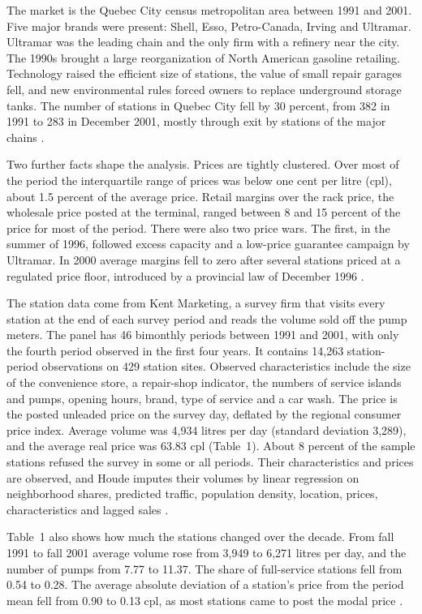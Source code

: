 The market is the Quebec City census metropolitan area between 1991 and 2001. Five major brands were present:
Shell, Esso, Petro-Canada, Irving and Ultramar. Ultramar was the leading chain and the only firm with a refinery
near the city. The 1990s brought a large reorganization of North American gasoline retailing. Technology raised the
efficient size of stations, the value of small repair garages fell, and new environmental rules forced owners to
replace underground storage tanks. The number of stations in Quebec City fell by 30 percent, from 382 in 1991 to
283 in December 2001, mostly through exit by stations of the major chains \citep[p.~2152]{Houde2012}.

Two further facts shape the analysis. Prices are tightly clustered. Over most of the period the interquartile range
of prices was below one cent per litre (cpl), about 1.5 percent of the average price. Retail margins over the rack
price, the wholesale price posted at the terminal, ranged between 8 and 15 percent of the price for most of the
period. There were also two price wars. The first, in the summer of 1996, followed excess capacity and a low-price
guarantee campaign by Ultramar. In 2000 average margins fell to zero after several stations priced at a regulated
price floor, introduced by a provincial law of December 1996 \citep[pp.~2152--2153]{Houde2012}.

The station data come from Kent Marketing, a survey firm that visits every station at the end of each survey period
and reads the volume sold off the pump meters. The panel has 46 bimonthly periods between 1991 and 2001, with only the
fourth period observed in the first four years. It contains 14,263 station-period observations on 429 station sites.
Observed characteristics include the size of the convenience store, a repair-shop indicator, the numbers of
service islands and pumps, opening hours, brand, type of service and a car wash. The price is the posted unleaded
price on the survey day, deflated by the regional consumer price index. Average volume was 4,934 litres per day
(standard deviation 3,289), and the average real price was 63.83 cpl (Table~1). About 8 percent of the sample
stations refused the survey in some or all periods. Their characteristics and prices are observed, and Houde imputes
their volumes by linear regression on neighborhood shares, predicted traffic, population density, location, prices,
characteristics and lagged sales \citep[p.~2151, n.~12]{Houde2012}.

Table~1 also shows how much the stations changed over the decade. From fall 1991 to fall 2001 average volume rose from
3,949 to 6,271 litres per day, and the number of pumps from 7.77 to 11.37. The share of full-service stations fell
from 0.54 to 0.28. The average absolute deviation of a station's price from the period mean fell from 0.90 to 0.13 cpl,
as most stations came to post the modal price \citep[p.~2152]{Houde2012}.

